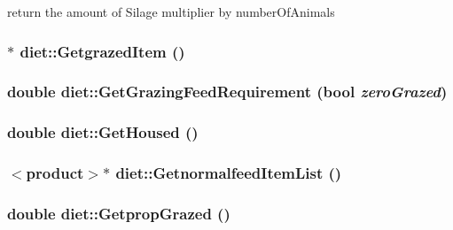 \label{classdiet_a78d45d92896f9dffca096c03809338be}
return the amount of Silage multiplier by numberOfAnimals \hypertarget{classdiet_a813b9f27c3b008eb71400a79a7495d8c}{
\subsubsection[{GetgrazedItem}]{$\ast$ diet::GetgrazedItem ()}}
\label{classdiet_a813b9f27c3b008eb71400a79a7495d8c}
\hypertarget{classdiet_a138e712affb55216103df24b015ab279}{
\subsubsection[{GetGrazingFeedRequirement}]{\setlength{\rightskip}{0pt plus 5cm}double diet::GetGrazingFeedRequirement (bool {\em zeroGrazed})}}
\label{classdiet_a138e712affb55216103df24b015ab279}
\hypertarget{classdiet_a19917e60acd3811c778cc304813b2031}{
\subsubsection[{GetHoused}]{\setlength{\rightskip}{0pt plus 5cm}double diet::GetHoused ()}}
\label{classdiet_a19917e60acd3811c778cc304813b2031}
\hypertarget{classdiet_a985a9a46ad9be5ead29bc69e736934da}{
\subsubsection[{GetnormalfeedItemList}]{$<${\bf product}$>$$\ast$ diet::GetnormalfeedItemList ()}}
\label{classdiet_a985a9a46ad9be5ead29bc69e736934da}
\hypertarget{classdiet_a6673b1f0e3b2b033b73c16a7e096ee87}{
\subsubsection[{GetpropGrazed}]{\setlength{\rightskip}{0pt plus 5cm}double diet::GetpropGrazed ()}}

